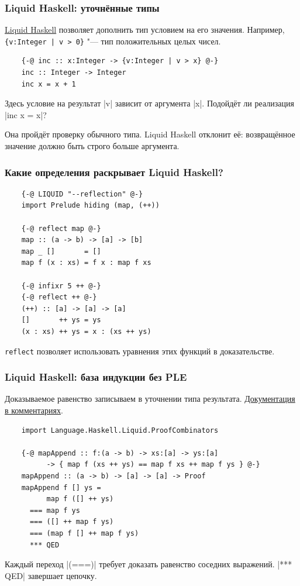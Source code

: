 \documentclass[11pt]{beamer}
\begin{document}
\begin{frame}[fragile]
  \frametitle{Liquid Haskell: уточнённые типы}
  \href{https://ucsd-progsys.github.io/liquidhaskell/}{Liquid Haskell} позволяет дополнить тип условием на его значения. Например, \texttt{\{v:Integer | v > 0\}} "--- тип положительных целых чисел.
  \begin{verbatim}
    {-@ inc :: x:Integer -> {v:Integer | v > x} @-}
    inc :: Integer -> Integer
    inc x = x + 1
  \end{verbatim}
  Здесь условие на результат \haskinline|v| зависит от аргумента \haskinline|x|. Подойдёт ли реализация \haskinline|inc x = x|? \pause

  Она пройдёт проверку обычного типа. Liquid Haskell отклонит её: возвращённое значение должно быть строго больше аргумента.
\end{frame}

\begin{frame}[fragile]
  \frametitle{Какие определения раскрывает Liquid Haskell?}
  \begin{verbatim}
    {-@ LIQUID "--reflection" @-}
    import Prelude hiding (map, (++))

    {-@ reflect map @-}
    map :: (a -> b) -> [a] -> [b]
    map _ []       = []
    map f (x : xs) = f x : map f xs

    {-@ infixr 5 ++ @-}
    {-@ reflect ++ @-}
    (++) :: [a] -> [a] -> [a]
    []       ++ ys = ys
    (x : xs) ++ ys = x : (xs ++ ys)
  \end{verbatim}
  \texttt{reflect} позволяет использовать уравнения этих функций в доказательстве.
\end{frame}

\begin{frame}[fragile]
  \frametitle{Liquid Haskell: база индукции без PLE}
  Доказываемое равенство записываем в уточнении типа результата.
  \href{https://github.com/ucsd-progsys/liquidhaskell/blob/master/liquid-prelude/src/Language/Haskell/Liquid/ProofCombinators.hs}{Документация в комментариях}.
  \begin{verbatim}
    import Language.Haskell.Liquid.ProofCombinators

    {-@ mapAppend :: f:(a -> b) -> xs:[a] -> ys:[a]
          -> { map f (xs ++ ys) == map f xs ++ map f ys } @-}
    mapAppend :: (a -> b) -> [a] -> [a] -> Proof
    mapAppend f [] ys =
          map f ([] ++ ys)
      === map f ys
      === ([] ++ map f ys)
      === (map f [] ++ map f ys)
      *** QED
  \end{verbatim}
  Каждый переход \haskinline|(===)| требует доказать равенство соседних выражений. \haskinline|*** QED| завершает цепочку.
\end{frame}
\end{document}
